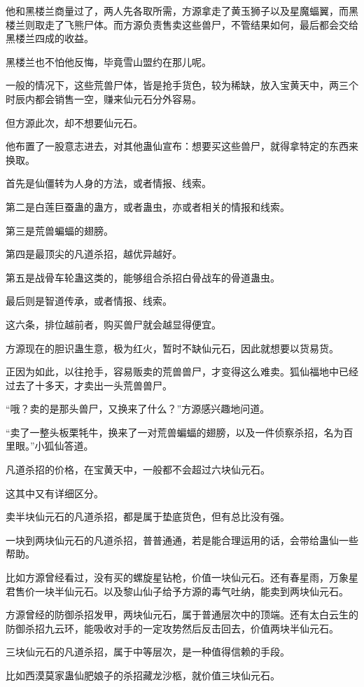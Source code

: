 \begin{this_body}
他和黑楼兰商量过了，两人先各取所需，方源拿走了黄玉狮子以及星魔蝠翼，而黑楼兰则取走了飞熊尸体。而方源负责售卖这些兽尸，不管结果如何，最后都会交给黑楼兰四成的收益。

黑楼兰也不怕他反悔，毕竟雪山盟约在那儿呢。

一般的情况下，这些荒兽尸体，皆是抢手货色，较为稀缺，放入宝黄天中，两三个时辰内都会销售一空，赚来仙元石分外容易。

但方源此次，却不想要仙元石。

他布置了一股意志进去，对其他蛊仙宣布：想要买这些兽尸，就得拿特定的东西来换取。

首先是仙僵转为人身的方法，或者情报、线索。

第二是白莲巨蚕蛊的蛊方，或者蛊虫，亦或者相关的情报和线索。

第三是荒兽蝙蝠的翅膀。

第四是最顶尖的凡道杀招，越优异越好。

第五是战骨车轮蛊这类的，能够组合杀招白骨战车的骨道蛊虫。

最后则是智道传承，或者情报、线索。

这六条，排位越前者，购买兽尸就会越显得便宜。

方源现在的胆识蛊生意，极为红火，暂时不缺仙元石，因此就想要以货易货。

正因为如此，以往抢手，容易贩卖的荒兽兽尸，才变得这么难卖。狐仙福地中已经过去了十多天，才卖出一头荒兽兽尸。

“哦？卖的是那头兽尸，又换来了什么？”方源感兴趣地问道。

“卖了一整头板栗牦牛，换来了一对荒兽蝙蝠的翅膀，以及一件侦察杀招，名为百里眼。”小狐仙答道。

凡道杀招的价格，在宝黄天中，一般都不会超过六块仙元石。

这其中又有详细区分。

卖半块仙元石的凡道杀招，都是属于垫底货色，但有总比没有强。

一块到两块仙元石的凡道杀招，普普通通，若是能合理运用的话，会带给蛊仙一些帮助。

比如方源曾经看过，没有买的螺旋星钻枪，价值一块仙元石。还有春星雨，万象星君售价一块半仙元石。以及黎山仙子给予方源的毒气吐纳，能卖到两块仙元石。

方源曾经的防御杀招发甲，两块仙元石，属于普通层次中的顶端。还有太白云生的防御杀招九云环，能吸收对手的一定攻势然后反击回去，价值两块半仙元石。

三块仙元石的凡道杀招，属于中等层次，是一种值得信赖的手段。

比如西漠莫家蛊仙肥娘子的杀招藏龙沙柩，就价值三块仙元石。


\end{this_body}
